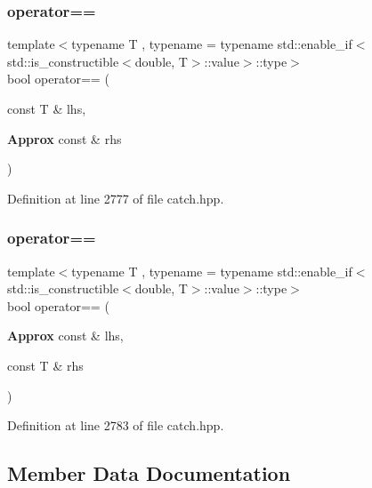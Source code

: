 \subsubsection{operator==\hspace{0.1cm}{\footnotesize\ttfamily [1/2]}}
{\footnotesize\ttfamily template$<$typename T , typename  = typename std\+::enable\+\_\+if$<$std\+::is\+\_\+constructible$<$double, T$>$\+::value$>$\+::type$>$ \\
bool operator== (\begin{DoxyParamCaption}\item[{const T \&}]{lhs,  }\item[{\textbf{ Approx} const \&}]{rhs }\end{DoxyParamCaption})\hspace{0.3cm}{\ttfamily [friend]}}



Definition at line 2777 of file catch.\+hpp.

\mbox{\label{class_catch_1_1_detail_1_1_approx_a0e5ef1957d4c38d7857005909c613743}} 
\subsubsection{operator==\hspace{0.1cm}{\footnotesize\ttfamily [2/2]}}
{\footnotesize\ttfamily template$<$typename T , typename  = typename std\+::enable\+\_\+if$<$std\+::is\+\_\+constructible$<$double, T$>$\+::value$>$\+::type$>$ \\
bool operator== (\begin{DoxyParamCaption}\item[{\textbf{ Approx} const \&}]{lhs,  }\item[{const T \&}]{rhs }\end{DoxyParamCaption})\hspace{0.3cm}{\ttfamily [friend]}}



Definition at line 2783 of file catch.\+hpp.



\subsection{Member Data Documentation}
\mbox{\label{class_catch_1_1_detail_1_1_approx_af17c8e869ae7a55d14b99eb18e178114}} 
